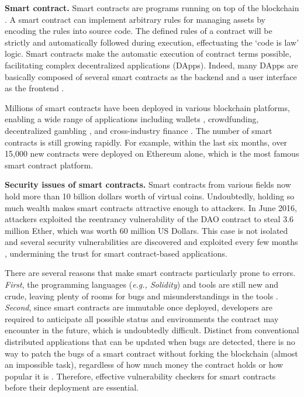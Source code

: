 \textbf{Smart contract.} Smart contracts are programs running on top of the blockchain \cite{Dhawan,oyente}. A smart contract can implement arbitrary rules for managing assets by encoding the rules into source code. The defined rules of a contract will be strictly and automatically followed during execution, effectuating the `code is law' logic. Smart contracts make the automatic execution of contract terms possible, facilitating complex decentralized applications (DApps). Indeed, many DApps are basically composed of several smart contracts as the backend and a user interface as the frontend \cite{dapps}.

Millions of smart contracts have been deployed in various blockchain platforms, enabling a wide range of applications including wallets \cite{wallet}, crowdfunding, decentralized gambling \cite{decentralized}, and cross-industry finance \cite{industry}. The number of smart contracts is still growing rapidly. For example, within the last six months, over 15,000 new contracts were deployed on Ethereum alone, which is the most famous smart contract platform. 

\textbf{Security issues of smart contracts.} Smart contracts from various fields now hold more than 10 billion dollars worth of virtual coins. Undoubtedly, holding so much wealth makes smart contracts attractive enough to attackers. In June 2016, attackers exploited the reentrancy vulnerability of the DAO contract \cite{DAO} to steal 3.6 million Ether, which was worth 60 million US Dollars. This case is not isolated and several security vulnerabilities are discovered and exploited every few months \cite{DAO,King,Multisig}, undermining the trust for smart contract-based applications.

There are several reasons that make smart contracts particularly prone to errors. \emph{First}, the programming languages (\emph{e.g., Solidity}) and tools are still new and crude, leaving plenty of rooms for bugs and misunderstandings in the tools \cite{oyente,smartcheck}. \emph{Second}, since smart contracts are immutable once deployed, developers are required to anticipate all possible status and environments the contract may encounter in the future, which is undoubtedly difficult. Distinct from conventional distributed applications that can be updated when bugs are detected, there is no way to patch the bugs of a smart contract without forking the blockchain (almost an impossible task), regardless of how much money the contract holds or how popular it is \cite{oyente}. Therefore, effective vulnerability checkers for smart contracts before their deployment are essential.

